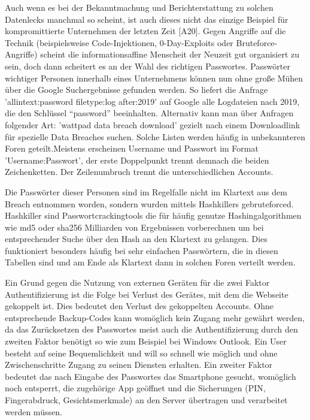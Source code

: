 Auch wenn es bei der Bekanntmachung und Berichterstattung zu solchen Datenlecks manchmal so scheint, ist auch dieses nicht das einzige Beispiel für kompromittierte Unternehmen der letzten Zeit [A20]. Gegen Angriffe auf die Technik (beispielsweise Code-Injektionen, 0-Day-Exploits oder Bruteforce-Angriffe) scheint die informationsaffine Menscheit der Neuzeit gut organisiert zu sein, doch dann scheitert es an der Wahl des richtigen Passwortes. Passwörter wichtiger Personen innerhalb eines Unternehmens können nun ohne große Mühen über die Google Suchergebnisse gefunden werden. So liefert die Anfrage 'allintext:password filetype:log after:2019' auf Google alle Logdateien nach 2019, die den Schlüssel ``password'' beeinhalten. Alternativ kann man  über Anfragen folgender Art: 'wattpad data breach download' gezielt nach einem Downloadlink für spezielle Data Breaches suchen. Solche Listen werden häufig in unbekannteren Foren geteilt.Meistens erscheinen Username und Passwort im Format 'Username:Passwort', der erste Doppelpunkt trennt demnach die beiden Zeichenketten. Der Zeilenumbruch trennt die unterschiedlichen Accounts.

Die Passwörter dieser Personen sind im Regelfalle nicht im Klartext aus dem Breach entnommen worden, sondern wurden mittels Hashkillers gebruteforced. Hashkiller sind Passwortcrackingtools die für häufig genutze Hashingalgorithmen wie md5 oder sha256 Milliarden von Ergebnissen vorberechnen um bei entsprechender Suche über den Hash an den Klartext zu gelangen. Dies funktioniert besonders häufig bei sehr einfachen Passwörtern, die in diesen Tabellen sind und am Ende als Klartext dann in solchen Foren verteilt werden.

Ein Grund gegen die Nutzung von externen Geräten für die zwei Faktor Authentifizierung ist die Folge bei Verlust des Gerätes, mit dem die Webseite gekoppelt ist. Dies bedeutet den Verlust des gekoppelten Accounts. Ohne entsprechende Backup-Codes kann womöglich kein Zugang mehr gewährt werden, da das Zurücksetzen des Passwortes meist auch die Authentifizierung durch den zweiten Faktor benötigt so wie zum Beispiel bei Windows Outlook. Ein User besteht auf seine Bequemlichkeit und will so schnell wie möglich und ohne Zwischenschritte Zugang zu seinen Diensten erhalten. Ein zweiter Faktor bedeutet das nach Eingabe des Passwortes das Smartphone gesucht, womöglich noch entsperrt, die zugehörige App geöffnet und die Sicherungen (PIN, Fingerabdruck, Gesichtsmerkmale) an den Server übertragen und verarbeitet werden müssen.
\newpage

